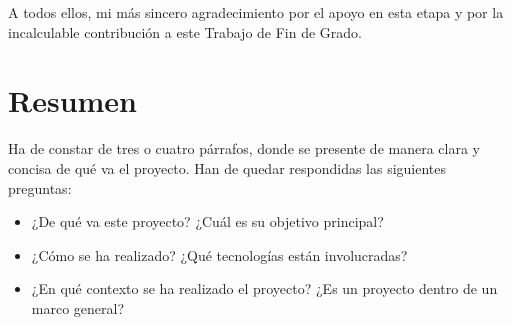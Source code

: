 \documentclass[a4paper, 12pt]{book}
\begin{document}
A todos ellos, mi más sincero agradecimiento por el apoyo en esta etapa y por la incalculable contribución a este Trabajo de Fin de Grado.
 



\chapter*{Resumen}


Ha de constar de tres o cuatro párrafos, donde se presente de manera clara y concisa de qué va el proyecto. 
Han de quedar respondidas las siguientes preguntas:

\begin{itemize}
  \item ¿De qué va este proyecto? ¿Cuál es su objetivo principal?
  \item ¿Cómo se ha realizado? ¿Qué tecnologías están involucradas?
  \item ¿En qué contexto se ha realizado el proyecto? ¿Es un proyecto dentro de un marco general?
\end{itemize}





\end{document}
